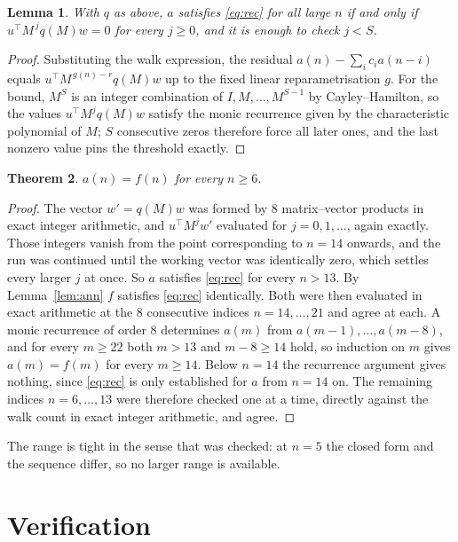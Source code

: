 \documentclass[11pt,a4paper]{article}
\theoremstyle{plain}
\newtheorem{theorem}{Theorem}
\newtheorem{lemma}[theorem]{Lemma}
\theoremstyle{definition}
\begin{document}
\begin{lemma}\label{lem:crit}
With $q$ as above, $a$ satisfies \eqref{eq:rec} for all large $n$ if and only if
$u^{\!\top}M^{\,j}q(M)w=0$ for every $j\ge0$, and it is enough to check $j<S$.
\end{lemma}

\begin{proof}
Substituting the walk expression, the residual $a(n)-\sum_ic_ia(n-i)$ equals
$u^{\!\top}M^{\,g(n)-r}q(M)w$ up to the fixed linear reparametrisation $g$. For the bound,
$M^{S}$ is an integer combination of $I,M,\dots,M^{S-1}$ by Cayley--Hamilton, so the values
$u^{\!\top}M^{j}q(M)w$ satisfy the monic recurrence given by the characteristic polynomial of
$M$; $S$ consecutive zeros therefore force all later ones, and the last nonzero value pins the
threshold exactly.
\end{proof}

\begin{theorem}
$a(n)=f(n)$ for every $n\ge6$.
\end{theorem}

\begin{proof}
The vector $w'=q(M)w$ was formed by $8$ matrix--vector products in exact integer
arithmetic, and $u^{\!\top}M^{j}w'$ evaluated for $j=0,1,\dots$, again exactly. Those integers
vanish from the point corresponding to $n=14$ onwards, and the run was continued until the
working vector was identically zero, which settles every larger $j$ at once. So $a$ satisfies
\eqref{eq:rec} for every $n>13$. By Lemma~\ref{lem:ann} $f$ satisfies \eqref{eq:rec}
identically. Both were then evaluated in exact arithmetic at the $8$ consecutive indices
$n=14,\dots,21$ and agree at each. A monic recurrence of order $8$
determines $a(m)$ from $a(m-1),\dots,a(m-8)$, and for every $m\ge22$ both
$m>13$ and $m-8\ge14$ hold, so induction on $m$ gives $a(m)=f(m)$ for every
$m\ge14$.
Below $n=14$ the recurrence argument gives nothing, since \eqref{eq:rec} is only
established for $a$ from $n=14$ on. The remaining indices $n=6,\dots,13$ were
therefore checked one at a time, directly against the walk count in exact integer arithmetic,
and agree.
\end{proof}

The range is tight in the sense that was checked: at $n=5$ the closed form and the sequence differ, so no larger range is available.

\section{Verification}
\end{document}
